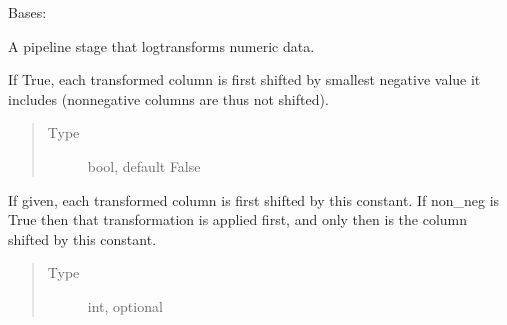 \documentclass[letterpaper,10pt,english]{sphinxmanual}
\begin{document}
\begin{fulllineitems}
\label{\detokenize{dalio.pipe:dalio.pipe.Log}}
Bases: {\hyperref[\detokenize{dalio.pipe:dalio.pipe.col_generation.Custom}]{}}

A pipeline stage that log\sphinxhyphen{}transforms numeric data.

\begin{fulllineitems}
\label{\detokenize{dalio.pipe:dalio.pipe.Log.non_neg}}
If True, each transformed column is
first shifted by smallest negative value it includes
(non\sphinxhyphen{}negative columns are thus not shifted).
\begin{quote}\begin{description}
\item[{Type}] \leavevmode
bool, default False

\end{description}\end{quote}

\end{fulllineitems}


\begin{fulllineitems}
\label{\detokenize{dalio.pipe:dalio.pipe.Log.const_shift}}
If given, each transformed column is
first shifted by this constant. If non\_neg is True then that
transformation is applied first, and only then is the column
shifted by this constant.
\begin{quote}\begin{description}
\item[{Type}] \leavevmode
int, optional

\end{description}\end{quote}

\end{fulllineitems}


\end{fulllineitems}
\end{document}
